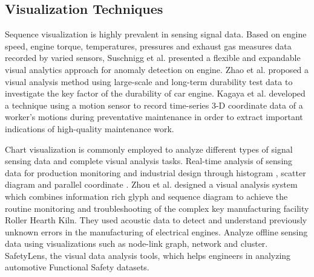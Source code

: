 \documentclass[a4paper,fleqn]{cas-dc}
\begin{document}
\subsection{Visualization Techniques}
Sequence visualization is highly prevalent in sensing signal data.
Based on engine speed, engine torque, temperatures, pressures and exhaust gas measures data recorded by varied sensors, Suschnigg et al. \cite{suschnigg2020exploration} presented a flexible and expandable visual analytics approach for anomaly detection on engine.
Zhao et al. \cite{zhao2019visual} proposed a visual analysis method using large-scale and long-term durability test data to investigate the key factor of the durability of car engine.
Kagaya et al. \cite{Kagaya2017} developed a technique using a motion sensor to record time-series 3-D coordinate data of a worker's motions during preventative maintenance in order to extract important indications of high-quality maintenance work.

Chart visualization is commonly employed to analyze different types of signal sensing data and complete visual analysis tasks. 
Real-time analysis of sensing data for production monitoring and industrial design through histogram \cite{Zhou2018, eirich2021irvine}, scatter diagram \cite{eirich2021irvine, cibulski2020paved} and parallel coordinate \cite{cibulski2020paved}.
Zhou et al. \cite{Zhou2018} designed a visual analysis system which combines information rich glyph and sequence diagram to achieve the routine monitoring and troubleshooting of the complex key manufacturing facility Roller Hearth Kiln.
They \cite{eirich2021irvine} used acoustic data to detect and understand previously unknown errors in the manufacturing of electrical engines.
Analyze offline sensing data using visualizations such as node-link graph\cite{Wang2022}, network and cluster\cite{narechania2020safetylens}.
SafetyLens\cite{narechania2020safetylens}, the visual data analysis tools, which helps engineers in analyzing automotive Functional Safety datasets.
\end{document}
